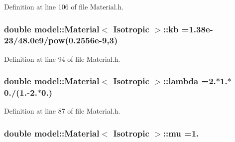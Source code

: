 Definition at line 106 of file Material.\+h.

\hypertarget{classmodel_1_1_material_3_01_isotropic_01_4_a8968e8a2f8c20c96b10892a937b1db08}{}
\subsubsection[{kb}]{\setlength{\rightskip}{0pt plus 5cm}double {\bf model\+::\+Material}$<$ {\bf Isotropic} $>$\+::kb =1.\+38e-\/23/48.\+0e9/pow(0.\+2556e-\/9,3)\hspace{0.3cm}{\ttfamily [static]}}\label{classmodel_1_1_material_3_01_isotropic_01_4_a8968e8a2f8c20c96b10892a937b1db08}


Definition at line 94 of file Material.\+h.

\hypertarget{classmodel_1_1_material_3_01_isotropic_01_4_adb6540f3999b1001c5525f395cabd635}{}
\subsubsection[{lambda}]{\setlength{\rightskip}{0pt plus 5cm}double {\bf model\+::\+Material}$<$ {\bf Isotropic} $>$\+::lambda =2.$\ast$1.$\ast$0./(1.-\/2.$\ast$0.)\hspace{0.3cm}{\ttfamily [static]}}\label{classmodel_1_1_material_3_01_isotropic_01_4_adb6540f3999b1001c5525f395cabd635}


Definition at line 87 of file Material.\+h.

\hypertarget{classmodel_1_1_material_3_01_isotropic_01_4_a299c77803eceaa3ce1d6c7f931028da3}{}
\subsubsection[{mu}]{\setlength{\rightskip}{0pt plus 5cm}double {\bf model\+::\+Material}$<$ {\bf Isotropic} $>$\+::mu =1.\hspace{0.3cm}{\ttfamily [static]}}\label{classmodel_1_1_material_3_01_isotropic_01_4_a299c77803eceaa3ce1d6c7f931028da3}


